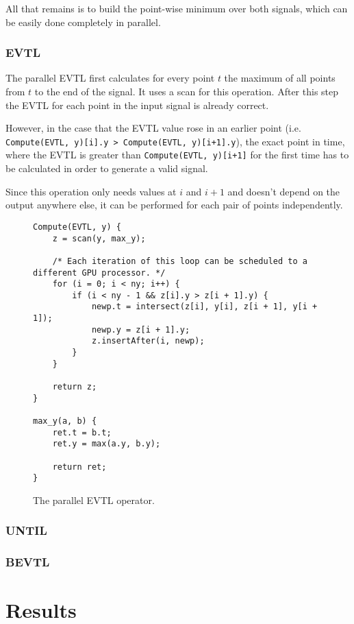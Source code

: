 \documentclass[a4paper,10pt]{article}
\begin{document}
All that remains is to build the point-wise minimum over both signals, which
can be easily done completely in parallel.

\subsubsection{EVTL}

The parallel EVTL first calculates for every point $t$ the maximum of all points from
$t$ to the end of the signal. It uses a scan for this operation. After this step the
EVTL for each point in the input signal is already correct.

However, in the case that the EVTL value rose in an earlier point (i.e.
\lstinline|Compute(EVTL, y)[i].y > Compute(EVTL, y)[i+1].y|), the exact point in time,
where the EVTL is greater than \lstinline|Compute(EVTL, y)[i+1]| for the first time
has to be calculated in order to generate a valid signal.

Since this operation only needs values at $i$ and $i + 1$ and doesn't depend on the
output anywhere else, it can be performed for each pair of points independently.

\begin{figure}[ht]
\begin{lstlisting}
Compute(EVTL, y) {
    z = scan(y, max_y);

    /* Each iteration of this loop can be scheduled to a different GPU processor. */
    for (i = 0; i < ny; i++) {
        if (i < ny - 1 && z[i].y > z[i + 1].y) {
            newp.t = intersect(z[i], y[i], z[i + 1], y[i + 1]);
            newp.y = z[i + 1].y;
            z.insertAfter(i, newp);
        }
    }

    return z;
}

max_y(a, b) {
    ret.t = b.t;
    ret.y = max(a.y, b.y);

    return ret;
}
\end{lstlisting}
\label{fig:par_evtl}
\caption{The parallel EVTL operator.}
\end{figure}

\subsubsection{UNTIL}

\subsubsection{BEVTL}


\section{Results}
\end{document}
